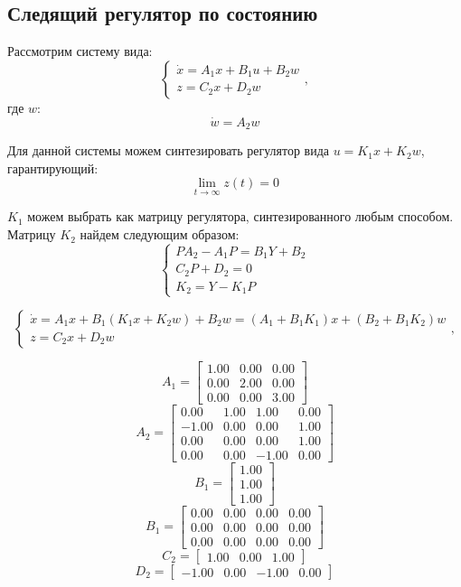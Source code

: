 \subsection{Следящий регулятор по состоянию}

Рассмотрим систему вида:
\[
    \begin{cases}
        \dot{x} = A_1x + B_1u + B_2w \\
        z = C_2x + D_2w
    \end{cases},
\]
где $w$:
\[
    \dot{w} = A_2w
\]

Для данной системы можем синтезировать регулятор вида $u = K_1x + K_2w$, гарантирующий:
\begin{equation*}
    \lim_{t\to\infty} z(t) = 0
\end{equation*}

$K_1$ можем выбрать как матрицу регулятора, синтезированного любым способом. Матрицу $K_2$ найдем следующим образом:
\[
    \begin{cases}
        PA_2 - A_1P = B_1Y + B_2\\
        C_2P + D_2 = 0 \\
        K_2 = Y - K_1P
    \end{cases}
\]

\[
    \begin{cases}
        \dot{x} = A_1x + B_1 (K_1x + K_2w) + B_2w = (A_1 + B_1 K_1) x + (B_2 + B_1 K_2)w \\
        z = C_2x + D_2 w
    \end{cases},
\]

\[A_1 = \begin{bmatrix}
  1.00 &  0.00 &  0.00\\
  0.00 &  2.00 &  0.00\\
  0.00 &  0.00 &  3.00
\end{bmatrix}\]
\[A_2 = \begin{bmatrix}
  0.00 &  1.00 &  1.00 &  0.00\\
 -1.00 &  0.00 &  0.00 &  1.00\\
  0.00 &  0.00 &  0.00 &  1.00\\
  0.00 &  0.00 & -1.00 &  0.00
\end{bmatrix}\]
\[B_1 = \begin{bmatrix}
  1.00\\
  1.00\\
  1.00
\end{bmatrix}\]
\[B_1 = \begin{bmatrix}
  0.00 &  0.00 &  0.00 &  0.00\\
  0.00 &  0.00 &  0.00 &  0.00\\
  0.00 &  0.00 &  0.00 &  0.00
\end{bmatrix}\]
\[C_2 = \begin{bmatrix}
  1.00 &  0.00 &  1.00
\end{bmatrix}\]
\[D_2 = \begin{bmatrix}
 -1.00 &  0.00 & -1.00 &  0.00
\end{bmatrix}\]


